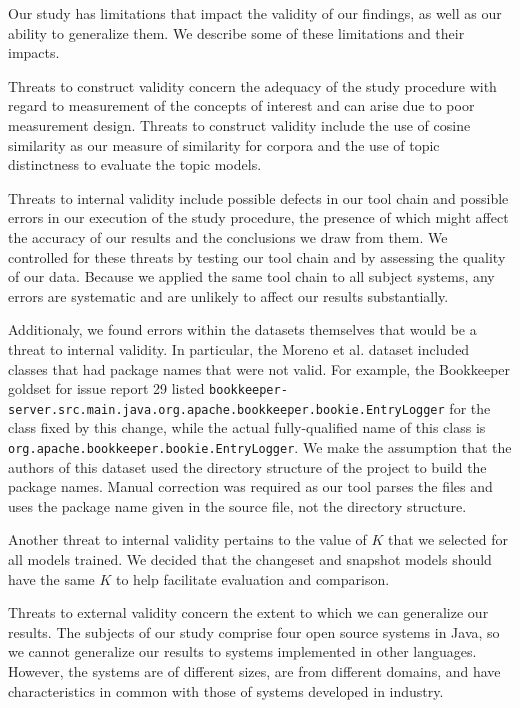 
Our study has limitations that impact the validity of our findings,
as well as our ability to generalize them.
We describe some of these limitations and their impacts.

Threats to construct validity concern the adequacy of the study procedure with regard to
measurement of the concepts of interest and can arise due to poor measurement design.
Threats to construct validity include the use of cosine similarity as our measure of similarity for corpora
and the use of topic distinctness to evaluate the topic models.

Threats to internal validity include possible defects in our tool chain and possible errors
in our execution of the study procedure,
the presence of which might affect the accuracy of our results and the conclusions we draw from them.
We controlled for these threats by testing our tool chain and by assessing the quality of our data.
Because we applied the same tool chain to all subject systems, any errors are systematic and are unlikely
to affect our results substantially.

Additionaly, we found errors within the datasets themselves that would be a threat to internal validity.
In particular, the Moreno et al. dataset included classes that had package names that were not valid.
For example, the Bookkeeper goldset for issue report 29 listed
\texttt{bookkeeper-server.src.main.java.org.apache.bookkeeper.bookie.EntryLogger}
for the class fixed by this change, while the actual fully-qualified name of this class is
\texttt{org.apache.bookkeeper.bookie.EntryLogger}.
We make the assumption that the authors of this dataset used the directory structure of the project to build the package names.
Manual correction was required as our tool parses the files and uses the package name given in the source file, not the directory structure.

Another threat to internal validity pertains to the value of $K$ that we selected for all models trained.
We decided that the changeset and snapshot models should have the same $K$
to help facilitate evaluation and comparison.

Threats to external validity concern the extent to which we can generalize our results.
The subjects of our study comprise four open source systems in Java,
so we cannot generalize our results to systems implemented in other languages.
However, the systems are of different sizes, are from different domains, and
have characteristics in common with those of systems developed in industry.


